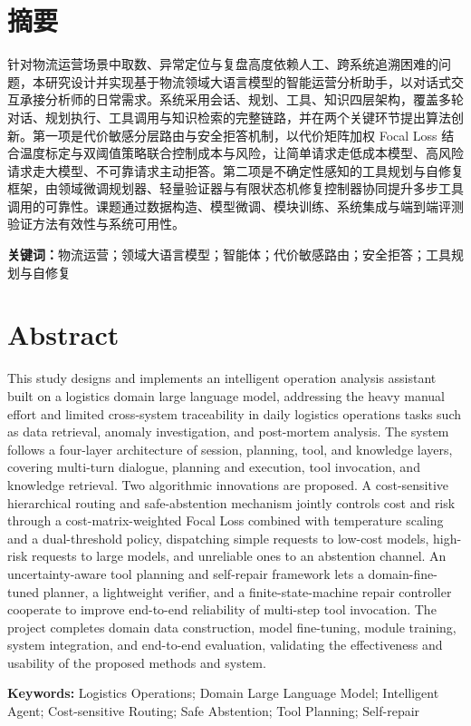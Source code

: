\cleardoublepage
\chapter*{摘要}

\par 针对物流运营场景中取数、异常定位与复盘高度依赖人工、跨系统追溯困难的问题，本研究设计并实现基于物流领域大语言模型的智能运营分析助手，以对话式交互承接分析师的日常需求。系统采用会话、规划、工具、知识四层架构，覆盖多轮对话、规划执行、工具调用与知识检索的完整链路，并在两个关键环节提出算法创新。第一项是代价敏感分层路由与安全拒答机制，以代价矩阵加权 Focal Loss 结合温度标定与双阈值策略联合控制成本与风险，让简单请求走低成本模型、高风险请求走大模型、不可靠请求主动拒答。第二项是不确定性感知的工具规划与自修复框架，由领域微调规划器、轻量验证器与有限状态机修复控制器协同提升多步工具调用的可靠性。课题通过数据构造、模型微调、模块训练、系统集成与端到端评测验证方法有效性与系统可用性。

\par \textbf{关键词：}物流运营；领域大语言模型；智能体；代价敏感路由；安全拒答；工具规划与自修复

\cleardoublepage
\chapter*{Abstract}

\par This study designs and implements an intelligent operation analysis assistant built on a logistics domain large language model, addressing the heavy manual effort and limited cross-system traceability in daily logistics operations tasks such as data retrieval, anomaly investigation, and post-mortem analysis. The system follows a four-layer architecture of session, planning, tool, and knowledge layers, covering multi-turn dialogue, planning and execution, tool invocation, and knowledge retrieval. Two algorithmic innovations are proposed. A cost-sensitive hierarchical routing and safe-abstention mechanism jointly controls cost and risk through a cost-matrix-weighted Focal Loss combined with temperature scaling and a dual-threshold policy, dispatching simple requests to low-cost models, high-risk requests to large models, and unreliable ones to an abstention channel. An uncertainty-aware tool planning and self-repair framework lets a domain-fine-tuned planner, a lightweight verifier, and a finite-state-machine repair controller cooperate to improve end-to-end reliability of multi-step tool invocation. The project completes domain data construction, model fine-tuning, module training, system integration, and end-to-end evaluation, validating the effectiveness and usability of the proposed methods and system.

\par \textbf{Keywords:} Logistics Operations; Domain Large Language Model; Intelligent Agent; Cost-sensitive Routing; Safe Abstention; Tool Planning; Self-repair
